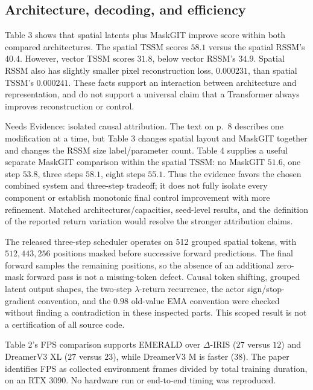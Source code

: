\documentclass[10pt]{article}
\begin{document}
\subsection*{Architecture, decoding, and efficiency}
Table 3 shows that spatial latents plus MaskGIT improve score within both compared architectures. The spatial TSSM scores \(58.1\) versus the spatial RSSM’s \(40.4\). However, vector TSSM scores \(31.8\), below vector RSSM’s \(34.9\). Spatial RSSM also has slightly smaller pixel reconstruction loss, \(0.000231\), than spatial TSSM’s \(0.000241\). These facts support an interaction between architecture and representation, and do not support a universal claim that a Transformer always improves reconstruction or control.\par
Needs Evidence: isolated causal attribution. The text on p. 8 describes one modification at a time, but Table 3 changes spatial layout and MaskGIT together and changes the RSSM size label/parameter count. Table 4 supplies a useful separate MaskGIT comparison within the spatial TSSM: no MaskGIT \(51.6\), one step \(53.8\), three steps \(58.1\), eight steps \(55.1\). Thus the evidence favors the chosen combined system and three-step tradeoff; it does not fully isolate every component or establish monotonic final control improvement with more refinement. Matched architectures/capacities, seed-level results, and the definition of the reported return variation would resolve the stronger attribution claims.\par
The released three-step scheduler operates on 512 grouped spatial tokens, with \(512,443,256\) positions masked before successive forward predictions. The final forward samples the remaining positions, so the absence of an additional zero-mask forward pass is not a missing-token defect. Causal token shifting, grouped latent output shapes, the two-step \(\lambda\)-return recurrence, the actor sign/stop-gradient convention, and the \(0.98\) old-value EMA convention were checked without finding a contradiction in these inspected parts. This scoped result is not a certification of all source code.\par
Table 2’s FPS comparison supports EMERALD over \(\Delta\)-IRIS (\(27\) versus \(12\)) and DreamerV3 XL (\(27\) versus \(23\)), while DreamerV3 M is faster (\(38\)). The paper identifies FPS as collected environment frames divided by total training duration, on an RTX 3090. No hardware run or end-to-end timing was reproduced.\par
\end{document}
